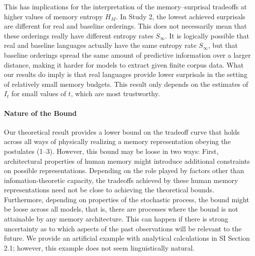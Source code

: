 This has implications for the interpretation of the memory--surprisal tradeoffs at higher values of memory entropy $H_M$.
In Study 2, the lowest achieved surprisals are different for real and baseline orderings.
This does not necessarily mean that these orderings really have different entropy rates $S_\infty$.
It is logically possible that real and baseline languages actually have the same entropy rate $S_\infty$, but that baseline orderings spread the same amount of predictive information over a larger distance, making it harder for models to extract given finite corpus data.
What our results do imply is that real languages provide lower surprisals in the setting of relatively small memory budgets. This result only depends on the estimates of $I_t$ for small values of $t$, which are most trustworthy.


\paragraph{Nature of the Bound}
Our theoretical result provides a lower bound on the tradeoff curve that holds across all ways of physically realizing a memory representation obeying the postulates (1--3).
However, this bound may be loose in two ways:
First, architectural properties of human memory might introduce additional constraints on possible representations.
Depending on the role played by factors other than infomation-theoretic capacity, the tradeoffs achieved by these human memory representations need not be close to achieving the theoretical bounds.
Furthermore, depending on properties of the stochastic process, the bound might be loose across all models, that is, there are processes where the bound is not attainable by any memory architecture.
This can happen if there is strong uncertainty as to which aspects of the past observations will be relevant to the future.
We provide an artificial example with analytical calculations in SI Section 2.1; however, this example does not seem linguistically natural.

